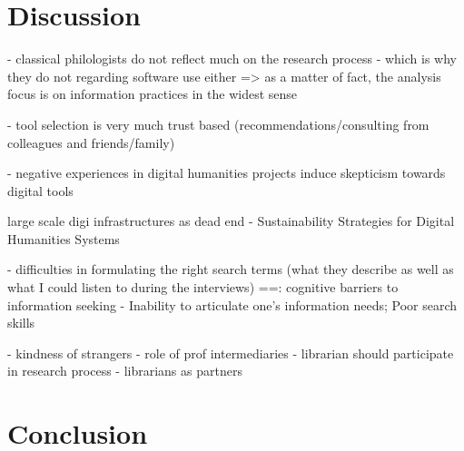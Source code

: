 \documentclass[12pt, a4paper, titlepage, oneside, abstract=true, toc=listof, toc=bibliography]{scrreprt}
\begin{document}
{%



\chapter{Discussion}

- classical philologists do not reflect much on the research process - which is why they do not regarding software use either => as a matter of fact, the analysis focus is on information practices in the widest sense


- tool selection is very much trust based (recommendations/consulting from colleagues and friends/family)

- negative experiences in digital humanities projects induce skepticism towards digital tools

\cite{Zundert2012} large scale digi infrastructures as dead end
\cite{Neuefeind2020} - Sustainability Strategies for Digital Humanities Systems

- difficulties in formulating the right search terms (what they describe as well as what I could listen to during the interviews)
==\cite{Savolainen2015a}: cognitive barriers to information seeking - Inability to articulate one’s information needs; Poor search skills


\cite{Constant1996} - kindness of strangers
\cite{Edmond2005} - role of prof intermediaries
\cite{Gunning1978} - librarian should participate in research process
\cite{MonroeGulick2013} - librarians as partners

\chapter{Conclusion}

}
\end{document}
